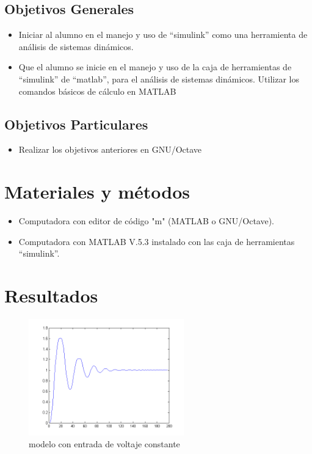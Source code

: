 \documentclass[]{article}
\begin{document}
\subsection{Objetivos Generales}

	\begin{itemize}
		\item Iniciar al alumno en el manejo y uso de “simulink” como una herramienta de análisis de sistemas dinámicos.
		\item Que el alumno se inicie en el manejo y uso de la caja de herramientas de “simulink” de “matlab”, para el análisis de sistemas dinámicos. Utilizar los comandos básicos de cálculo en MATLAB
	\end{itemize}

\subsection{Objetivos Particulares}

	\begin{itemize}
		\item Realizar los objetivos anteriores en GNU/Octave
	\end{itemize}

\section{Materiales y métodos}

	\begin{itemize}
		\item Computadora con editor de código "m" (MATLAB o GNU/Octave).
		\item Computadora con MATLAB V.5.3 instalado con las caja de herramientas “simulink”.
	\end{itemize}
	
\section{Resultados}

\begin{figure}[h!]
	\centering
	\includegraphics[width=0.6\textwidth]{modeloConst.png}
	\caption{modelo con entrada de voltaje constante}
	\label{fig:modeloConst}
\end{figure}
\end{document}
